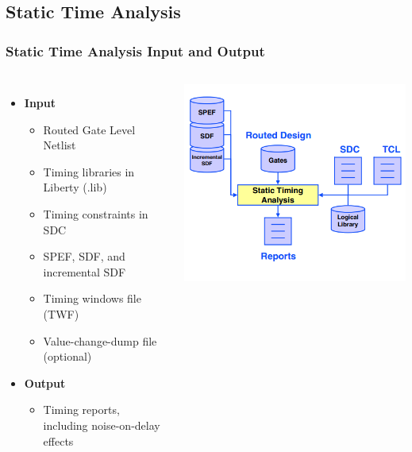 \documentclass[compress]{beamer}
\begin{document}
\subsection[STA]{Static Time Analysis}
\begin{frame}
	\frametitle{Static Time Analysis Input and Output}
	\begin{columns}	
		\begin{itemize}
			\item \textbf{Input}
			\begin{itemize}
				\item Routed Gate Level Netlist  
				\item Timing libraries in Liberty (.lib)
				\item Timing constraints in SDC
				\item SPEF, SDF, and incremental SDF
				\item Timing windows file (TWF)
				\item Value-change-dump file (optional)
			\end{itemize}
			\item \textbf{Output}
			\begin{itemize}
				\item Timing reports, including noise-on-delay effects
			\end{itemize}
		\end{itemize}
		\begin{center}
			\includegraphics[width=\textwidth]{STA}
		\end{center}
	\end{columns}
\end{frame}
\end{document}
